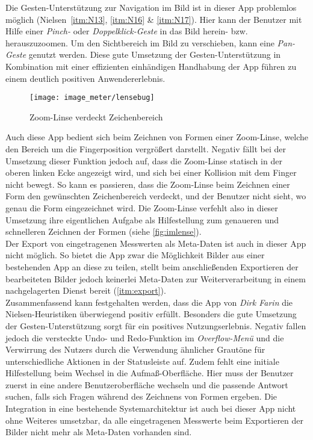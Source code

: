 Die Gesten-Unterstützung zur Navigation im Bild ist in dieser App problemlos möglich (Nielsen~\autoref{itm:N13}, \autoref{itm:N16} \& \autoref{itm:N17}).
Hier kann der Benutzer mit Hilfe einer \emph{Pinch-} oder \emph{Doppelklick-Geste} in das Bild herein- bzw. herauszuzoomen.
Um den Sichtbereich im Bild zu verschieben, kann eine \emph{Pan-Geste} genutzt werden.
Diese gute Umsetzung der Gesten-Unterstützung in Kombination mit einer effizienten einhändigen Handhabung der App führen zu einem deutlich positiven Anwendererlebnis.

\begin{wrapfigure}{R}{0.4\textwidth}
  \centering
  \texttt{[image: image\_meter/lensebug]}
  \caption{Zoom-Linse verdeckt Zeichenbereich}
  \label{fig:imlense}
\end{wrapfigure}

Auch diese App bedient sich beim Zeichnen von Formen einer Zoom-Linse, welche den Bereich um die Fingerposition vergrößert darstellt.
Negativ fällt bei der Umsetzung dieser Funktion jedoch auf, dass die Zoom-Linse statisch in der oberen linken Ecke angezeigt wird, und sich bei einer Kollision mit dem Finger nicht bewegt.
So kann es passieren, dass die Zoom-Linse beim Zeichnen einer Form den gewünschten Zeichenbereich verdeckt, und der Benutzer nicht sieht, wo genau die Form eingezeichnet wird.
Die Zoom-Linse verfehlt also in dieser Umsetzung ihre eigentlichen Aufgabe als Hilfestellung zum genaueren und schnelleren Zeichnen der Formen (siehe \autoref{fig:imlense}). \\

Der Export von eingetragenen Messwerten als Meta-Daten ist auch in dieser App nicht möglich.
So bietet die App zwar die Möglichkeit Bilder aus einer bestehenden App an diese zu teilen, stellt beim anschließenden Exportieren der bearbeiteten Bilder jedoch keinerlei Meta-Daten zur Weiterverarbeitung in einem nachgelagerten Dienst bereit (\autoref{itm:export}). \\

Zusammenfassend kann festgehalten werden, dass die App \im{} von \emph{Dirk Farin} die Nielsen-Heuristiken überwiegend positiv erfüllt.
Besonders die gute Umsetzung der Gesten-Unterstützung sorgt für ein positives Nutzungserlebnis.
Negativ fallen jedoch die versteckte Undo- und Redo-Funktion im \emph{Overflow-Menü} und die Verwirrung des Nutzers durch die Verwendung ähnlicher Grautöne für unterschiedliche Aktionen in der Statusleiste auf.
Zudem fehlt eine initiale Hilfestellung beim Wechsel in die Aufmaß-Oberfläche.
Hier muss der Benutzer zuerst in eine andere Benutzeroberfläche wechseln und die passende Antwort suchen, falls sich Fragen während des Zeichnens von Formen ergeben.
Die Integration in eine bestehende Systemarchitektur ist auch bei dieser App nicht ohne Weiteres umsetzbar, da alle eingetragenen Messwerte beim Exportieren der Bilder nicht mehr als Meta-Daten vorhanden sind.

